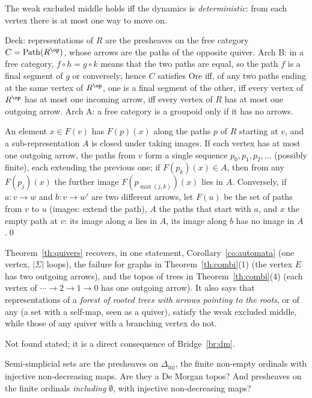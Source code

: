 \inwords{} The weak excluded middle holds iff the dynamics is \emph{deterministic}: from each vertex there is at most one way to move on.

\gen{} Deck: representations of $R$ are the presheaves on the free category $C = \mathrm{Path}(R^{\op})$, whose arrows are the paths of the opposite quiver. Arch B: in a free category, $f\circ h = g\circ k$ means that the two paths are equal, so the path $f$ is a final segment of $g$ or conversely; hence $C$ satisfies Ore iff, of any two paths ending at the same vertex of $R^{\op}$, one is a final segment of the other, iff every vertex of $R^{\op}$ has at most one incoming arrow, iff every vertex of $R$ has at most one outgoing arrow. Arch A: a free category is a groupoid only if it has no arrows.

\direct{} An element $x\in F(v)$ has  $F(p)(x)$ along the paths $p$ of $R$ starting at $v$, and a sub-representation $A$ is closed under taking images. If each vertex has at most one outgoing arrow, the paths from $v$ form a single sequence $p_0, p_1, p_2,\dots$ (possibly finite), each extending the previous one; if $F(p_k)(x)\in A$, then from any $F(p_j)(x)$ the further image $F(p_{\max(j,k)})(x)$ lies in $A$. Conversely, if $a : v\to w$ and $b : v\to w'$ are two different arrows, let $F(u)$ be the set of paths from $v$ to $u$ (images: extend the path), $A$ the paths that start with $a$, and $x$ the empty path at $v$: its image along $a$ lies in $A$, its image along $b$ has no image in $A$.\qed

\begin{example}
Theorem~\ref{th:quivers} recovers, in one statement, Corollary~\ref{co:automata} (one vertex, $|\Sigma|$ loops), the failure for graphs in Theorem~\ref{th:combi}(1) (the vertex $E$ has two outgoing arrows), and the topos of trees in Theorem~\ref{th:combi}(4) (each vertex of $\cdots\to 2\to 1\to 0$ has one outgoing arrow). It also says that representations of a \emph{forest of rooted trees with arrows pointing to the roots}, or of any  (a set with a self-map, seen as a quiver), satisfy the weak excluded middle, while those of any quiver with a branching vertex do not.
\end{example}

\status{} Not found stated; it is a direct consequence of Bridge~\ref{br:dm}.

\begin{exercise}\label{exo:semisimplicial}
Semi-simplicial sets are the presheaves on $\Delta_{\mathrm{inj}}$, the finite non-empty ordinals with injective non-decreasing maps. Are they a De Morgan topos? And presheaves on the finite ordinals \emph{including} $\emptyset$, with injective non-decreasing maps?
\end{exercise}
